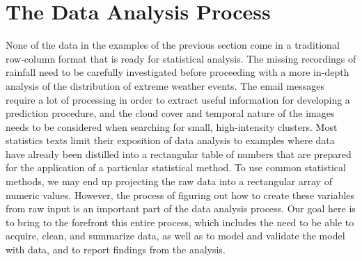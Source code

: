 \section{The  Data Analysis Process}
None of the data in the examples of  the previous section come in
a traditional row-column format that is ready for statistical
analysis.  The missing recordings of rainfall need to be carefully
investigated before proceeding with a more in-depth analysis of the
distribution of extreme weather events.  The email messages require a
lot of processing in order to extract useful information for
developing a prediction procedure, and the cloud cover and temporal
nature of the images needs to be considered when searching
for small, high-intensity clusters.  Most
statistics texts limit their exposition of data analysis to examples
where data have already been distilled into a rectangular table of
numbers that are prepared for the application of a particular
statistical method.  To use common statistical methods, we may end up
projecting the raw data into a rectangular array of numeric values.
However, the process of figuring out how to create these variables
from raw input is an important part of the data analysis process.  Our
goal here is to bring to the forefront this entire process, which
includes the need to be able to acquire, clean, and summarize data,
as well as to model and validate the model with data, and to 
report findings from the analysis.

